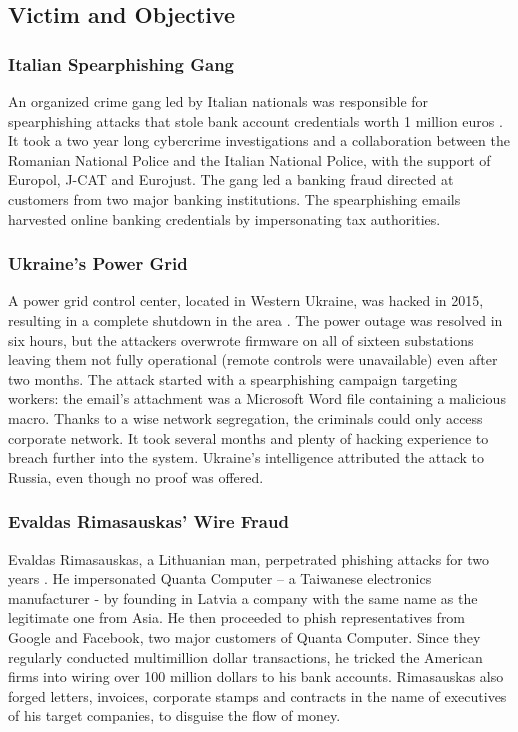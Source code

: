\documentclass[a4paper]{article}
\begin{document}
\subsection{Victim and Objective}

\subsubsection{Italian Spearphishing Gang}

An organized crime gang led by Italian nationals was responsible for spearphishing attacks that stole bank account credentials worth 1 million euros \cite{report-iocta}. It took a two year long cybercrime investigations and a collaboration between the Romanian National Police and the Italian National Police, with the support of Europol, J-CAT and Eurojust. The gang led a banking fraud directed at customers from two major banking institutions. The spearphishing emails harvested online banking credentials by impersonating tax authorities.

\subsubsection{Ukraine's Power Grid}

A power grid control center, located in Western Ukraine, was hacked in 2015, resulting in a complete shutdown in the area \cite{article-ukraine-power}. The power outage was resolved in six hours, but the attackers overwrote firmware on all of sixteen substations leaving them not fully operational (remote controls were unavailable) even after two months. The attack started with a spearphishing campaign targeting workers: the email's attachment was a Microsoft Word file containing a malicious macro. Thanks to a wise network segregation, the criminals could only access corporate network. It took several months and plenty of hacking experience to breach further into the system. Ukraine's intelligence attributed the attack to Russia, even though no proof was offered.

\subsubsection{Evaldas Rimasauskas' Wire Fraud}

Evaldas Rimasauskas, a Lithuanian man, perpetrated phishing attacks for two years \cite{article-rimasauskas}. He impersonated Quanta Computer – a Taiwanese electronics manufacturer - by founding in Latvia a company with the same name as the legitimate one from Asia. He then proceeded to phish representatives from Google and Facebook, two major customers of Quanta Computer. Since they regularly conducted multimillion dollar transactions, he tricked the American firms into wiring over 100 million dollars to his bank accounts. Rimasauskas also forged letters, invoices, corporate stamps and contracts in the name of executives of his target companies, to disguise the flow of money.
\end{document}
